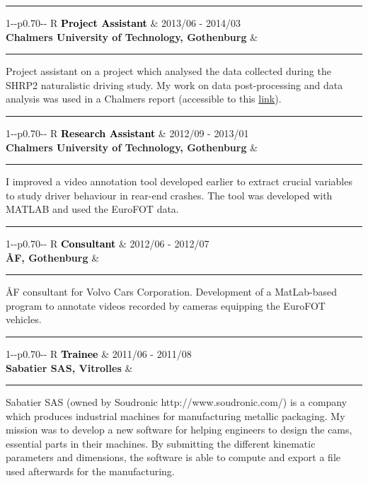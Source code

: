 \documentclass[10pt,A4]{article}
\newcommand{\mpwidth}{\linewidth-\fboxsep-\fboxsep}
\newcommand{\cvevent}[4]
{
\vspace{8pt}
	\begin{tabularx}{1\mpwidth}{p{0.70\mpwidth}  R}
	 \textcolor{black}{\textbf{#2}} & \textcolor{bgcol}{#1} \\
	 \textcolor{complcol}{\textbf{#3}} & 	 
	\end{tabularx}
\vspace{2pt}
\textcolor{softcol}{\hrule}
\vspace{2pt}
\begin{center}
\parbox{.95\mpwidth}{
#4
}
\end{center}
}
\begin{document}
{\begin{minipage}[c][0.98\textheight][t]{0.69\linewidth}
\textcolor{softcol}{\hrule}

\cvevent{2013/06 - 2014/03}{Project Assistant}{Chalmers University of Technology, Gothenburg}{Project assistant on a project which analysed the data collected during the SHRP2 naturalistic driving study. My work on data post-processing and data analysis was used in a Chalmers report (accessible to this \textcolor{complcol}{\href{http://www.trb.org/Publications/Blurbs/171327.aspx}{link}}).}

\textcolor{softcol}{\hrule}

\cvevent{2012/09 - 2013/01}{Research Assistant}{Chalmers University of Technology, Gothenburg}{I improved a video annotation tool developed earlier to extract crucial variables to study driver behaviour in rear-end crashes. The tool was developed with MATLAB and used the EuroFOT data.}

\textcolor{softcol}{\hrule}

\cvevent{2012/06 - 2012/07}{Consultant}{ÅF, Gothenburg}{ÅF consultant for Volvo Cars Corporation. Development of a MatLab-based program to annotate videos recorded by cameras equipping the EuroFOT vehicles. }

\textcolor{softcol}{\hrule}

\cvevent{2011/06 - 2011/08}{Trainee}{Sabatier SAS, Vitrolles}{
	Sabatier SAS (owned by Soudronic http://www.soudronic.com/) is a company which produces industrial machines for manufacturing metallic packaging. My mission was to develop a new software for helping engineers to design the cams, essential parts in their machines. By submitting the different kinematic parameters and dimensions, the software is able to compute and export a file used afterwards for the manufacturing.}


\end{minipage}}%
\end{document}
